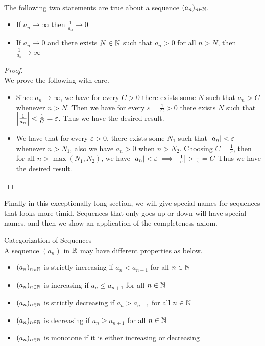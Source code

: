 \documentclass[a4paper]{article}
\begin{document}
\begin{prp}{}{}\\ The following two statements are true about a sequence $(a_n)_{n\in\mathbb{N}}$. 
\begin{itemize}
\item If $a_n\to\infty$ then $\frac{1}{a_n}\to 0$
\item If $a_n\to 0$ and there exists $N\in\mathbb{N}$ such that $a_n>0$ for all $n>N$, then $\frac{1}{a_n}\to\infty$
\end{itemize}
\begin{proof}\\ We prove the following with care. 
\begin{itemize}
\item Since $a_n\to\infty$, we have for every $C>0$ there exists some $N$ such that $a_n>C$ whenever $n>N$. Then we have for every $\varepsilon=\frac{1}{C}>0$ there exists $N$ such that $\abs{\frac{1}{a_n}}<\frac{1}{C}=\varepsilon$. Thus we have the desired result. 
\item We have that for every $\varepsilon>0$, there exists some $N_1$ such that $\abs{a_n}<\varepsilon$ whenever $n>N_1$, also we have $a_n>0$ when $n>N_2$. Choosing $C=\frac{1}{\varepsilon}$, then for all $n>\max{(N_1,N_2)}$, we have $\abs{a_n}<\varepsilon\implies\abs{\frac{1}{\varepsilon}}>\frac{1}{\varepsilon}=C$ Thus we have the desired result. 
\end{itemize}
\end{proof}
\end{prp}

Finally in this exceptionally long section, we will give special names for sequences that looks more timid. Sequences that only goes up or down will have special names, and then we show an application of the completeness axiom. 

\begin{defn}{Categorization of Sequences}{}\\ A sequence $(a_n)$ in $\mathbb{R}$ may have different properties as below. 
\begin{itemize}
\item $(a_n)_{n\in\mathbb{N}}$ is strictly increasing if $a_n<a_{n+1}$ for all $n\in\mathbb{N}$
\item $(a_n)_{n\in\mathbb{N}}$ is increasing if $a_n\leq a_{n+1}$ for all $n\in\mathbb{N}$
\item $(a_n)_{n\in\mathbb{N}}$ is strictly decreasing if $a_n>a_{n+1}$ for all $n\in\mathbb{N}$
\item $(a_n)_{n\in\mathbb{N}}$ is decreasing if $a_n\geq a_{n+1}$ for all $n\in\mathbb{N}$
\item $(a_n)_{n\in\mathbb{N}}$ is monotone if it is either increasing or decreasing
\end{itemize}
\end{defn}
\end{document}
